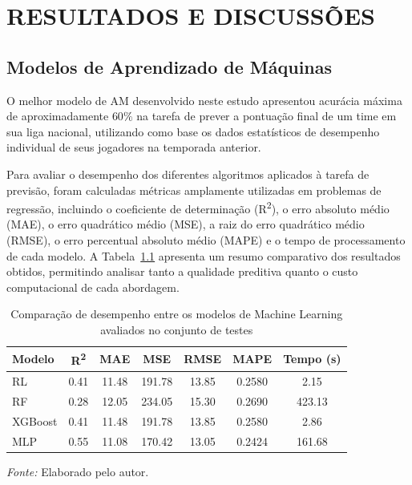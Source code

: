 \chapter{RESULTADOS E DISCUSSÕES}

\section{Modelos de Aprendizado de Máquinas}

O melhor modelo de AM desenvolvido neste estudo apresentou acurácia máxima de aproximadamente $60\%$ na tarefa de prever a pontuação final de um time em sua liga nacional, utilizando
como base os dados estatísticos de desempenho individual de seus jogadores na temporada anterior.

Para avaliar o desempenho dos diferentes algoritmos aplicados à tarefa de previsão, foram calculadas métricas 
amplamente utilizadas em problemas de regressão, incluindo o coeficiente de determinação (R\textsuperscript{2}), 
o erro absoluto médio (MAE), o erro quadrático médio (MSE), a raiz do erro quadrático médio (RMSE), 
o erro percentual absoluto médio (MAPE) e o tempo de processamento de cada modelo. A Tabela~\ref{tab:comparacao_modelos} 
apresenta um resumo comparativo dos resultados obtidos, permitindo analisar tanto a qualidade preditiva 
quanto o custo computacional de cada abordagem.

\begin{table}[H]
\centering
\caption{Comparação de desempenho entre os modelos de Machine Learning avaliados no conjunto de testes}
\label{tab:comparacao_modelos}
\begin{tabular}{lcccccc}
\hline
\textbf{Modelo} & \textbf{R\textsuperscript{2}} & \textbf{MAE} & \textbf{MSE} & \textbf{RMSE} & \textbf{MAPE} & \textbf{Tempo (s)} \\
\hline
RL      & 0.41 & 11.48 & 191.78 & 13.85 & 0.2580 & 2.15 \\
RF      & 0.28 & 12.05 & 234.05 & 15.30 & 0.2690 & 423.13 \\
XGBoost & 0.41 & 11.48 & 191.78 & 13.85 & 0.2580 & 2.86 \\
MLP     & 0.55 & 11.08 & 170.42 & 13.05 & 0.2424 & 161.68 \\
\hline
\end{tabular}

\vspace{0.3cm}
{\footnotesize \textit{Fonte:} Elaborado pelo autor.}

\end{table}

